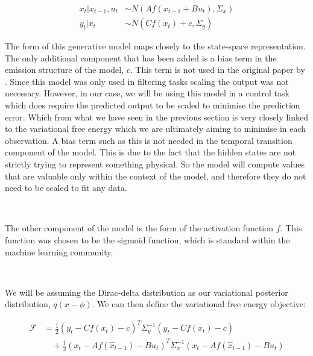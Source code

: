 \documentclass{article}
\begin{document}
\begin{equation}
\begin{aligned}
	x_t | x_{t-1}, u_{t} &\sim N( A f(x_{t-1} + B u_{t}), \Sigma_x) \\
	y_t | x_t &\sim N( C f(x_t) + c, \Sigma_y)
\end{aligned}
\end{equation}

The form of this generative model maps closely to the state-space representation. The only additional component that has been added is a bias term in the emission structure of the model, $c$. This term is not used in the original paper by \citet{millidge2024temporal}. Since this model was only used in filtering tasks scaling the output was not necessary. However, in our case, we will be using this model in a control task which does require the predicted output to be scaled to minimise the prediction error. Which from what we have seen in the previous section is very closely linked to the variational free energy which we are ultimately aiming to minimise in each observation. A bias term such as this is not needed in the temporal transition component of the model. This is due to the fact that the hidden states are not strictly trying to represent something physical. So the model will compute values that are valuable only within the context of the model, and therefore they do not need to be scaled to fit any data.

\

The other component of the model is the form of the activation function $f$. This function was chosen to be the sigmoid function, which is standard within the machine learning community. 

\

We will be assuming the Dirac-delta distribution as our variational posterior distribution, $q(x - \phi)$. We can then define the variational free energy objective:

\begin{equation}
    \begin{aligned}
        \mathcal{F} &= \frac{1}{2} \left(y_t - C f\left(x_t\right) - c\right)^T \Sigma_y^{-1} \left(y_t - C f\left(x_t\right) - c\right) \\
        &\quad + \frac{1}{2} \left(x_t - A f\left(\hat{x}_{t-1}\right) - B u_t\right)^T \Sigma_x^{-1} \left(x_t - A f\left(\hat{x}_{t-1}\right) - B u_t\right)
    \end{aligned}
\end{equation}
\end{document}
